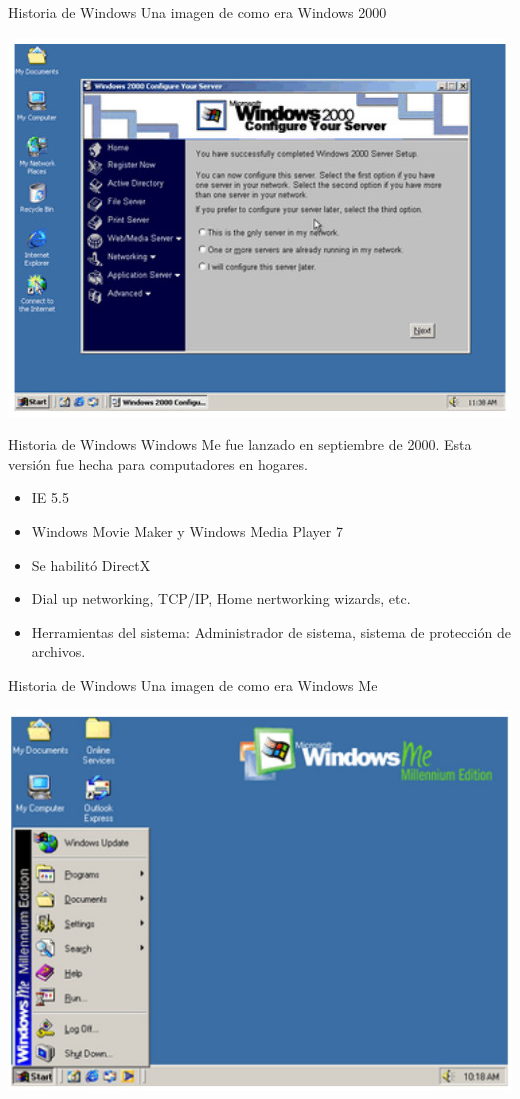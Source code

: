 \documentclass[11pt]{beamer}
\begin{document}
		\begin{frame}{Historia de Windows}
			Una imagen de como era Windows 2000
			
			\includegraphics[scale=0.6]{w2k.jpg}
		\end{frame}
		\begin{frame}{Historia de Windows}
			Windows Me fue lanzado en septiembre de 2000. Esta versión fue hecha para computadores en hogares.
			\begin{itemize}
				\item IE 5.5
				\item Windows Movie Maker y Windows Media Player 7
				\item Se habilitó DirectX
				\item Dial up networking, TCP/IP, Home nertworking wizards, etc.
				\item Herramientas del sistema: Administrador de sistema, sistema de protección de archivos.
			\end{itemize}
		\end{frame}
		\begin{frame}{Historia de Windows}
			Una imagen de como era Windows Me
			
			\includegraphics[scale=0.6]{wme.jpg}
		\end{frame}
\end{document}
